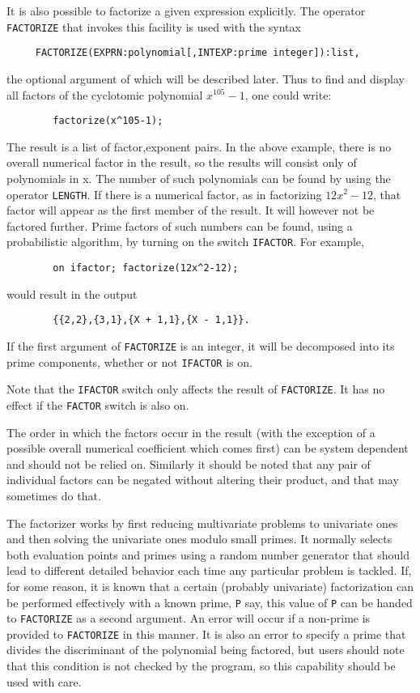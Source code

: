 \hypertarget{operator:FACTORIZE}{}
It is also possible to factorize a given expression explicitly.  The
operator {\tt FACTORIZE} that invokes this facility is
used with the syntax
\begin{verbatim}
     FACTORIZE(EXPRN:polynomial[,INTEXP:prime integer]):list,
\end{verbatim}
the optional argument of which will be described later. Thus to find and
display all factors of the cyclotomic polynomial $x^{105}-1$, one could
write:
\begin{verbatim}
        factorize(x^105-1);
\end{verbatim}
The result is a list of factor,exponent pairs.
In the above example, there is no overall numerical factor in the result,
so the results will consist only of polynomials in x.  The number of such
polynomials can be found by using the operator {\tt LENGTH}.
If there is a numerical factor, as in factorizing $12x^{2}-12$,
that factor will appear as the first member of the result.
It will however not be factored further.  Prime factors of such numbers
can be found, using a probabilistic algorithm, by turning on the switch
{\tt IFACTOR}.  For example,
\begin{verbatim}
        on ifactor; factorize(12x^2-12);
\end{verbatim}
would result in the output
\begin{verbatim}
        {{2,2},{3,1},{X + 1,1},{X - 1,1}}.
\end{verbatim}

If the first argument of {\tt FACTORIZE} is an integer, it will be
decomposed into its prime components, whether or not {\tt IFACTOR} is on.

Note that the {\tt IFACTOR} switch only affects the result of {\tt FACTORIZE}.
It has no effect if the {\tt FACTOR} switch is also on.

The order in which the factors occur in the result (with the exception of
a possible overall numerical coefficient which comes first) can be system
dependent and should not be relied on. Similarly it should be noted that
any pair of individual factors can be negated without altering their
product, and that {\REDUCE} may sometimes do that.

The factorizer works by first reducing multivariate problems to univariate
ones and then solving the univariate ones modulo small primes. It normally
selects both evaluation points and primes using a random number generator
that should lead to different detailed behavior each time any particular
problem is tackled. If, for some reason, it is known that a certain
(probably univariate) factorization can be performed effectively with a
known prime, {\tt P} say, this value of {\tt P} can be handed to
{\tt FACTORIZE} as a second
argument. An error will occur if a non-prime is provided to {\tt FACTORIZE} in
this manner. It is also an error to specify a prime that divides the
discriminant of the polynomial being factored, but users should note that
this condition is not checked by the program, so this capability should be
used with care.

